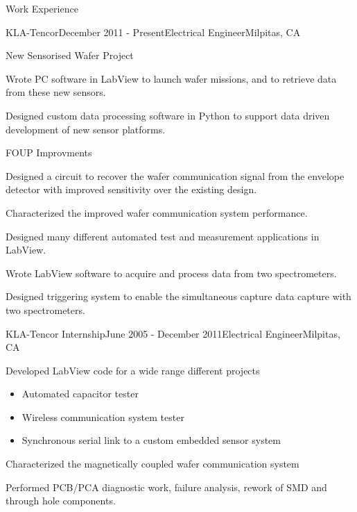 \documentclass{resume} %
\begin{document}
\begin{rSection}{Work Experience}
\begin{rSubsection}{KLA-Tencor}{December 2011 - Present}{Electrical Engineer}{Milpitas, CA}
\begin{rWorkProject}{New Sensorised Wafer Project}
\item Wrote PC software in LabView to launch wafer missions, and to retrieve data from these new sensors.
\item Designed custom data processing software in Python to support data driven development of new sensor platforms.
\end{rWorkProject}

\begin{rWorkProject}{FOUP Improvments}
\item Designed a circuit to recover the wafer communication signal from the envelope detector with improved sensitivity over the existing design.
\item Characterized the improved wafer communication system performance.
\end{rWorkProject}

\smallskip
\item Designed many different automated test and measurement applications in LabView.
\item Wrote LabView software to acquire and process data from two spectrometers.
\item Designed triggering system to enable the simultaneous capture data capture with two spectrometers.
\end{rSubsection}


\begin{rSubsection}{KLA-Tencor Internship}{June 2005 - December 2011}{Electrical Engineer}{Milpitas, CA}
\item Developed LabView code for a wide range different projects
\begin{itemize}
\itemsep -0.5em \vspace{-0.5em}
\renewcommand{\labelitemi}{-}
\item Automated capacitor tester
\item Wireless communication system tester
\item Synchronous serial link to a custom embedded sensor system
\end{itemize}
\item Characterized the magnetically coupled wafer communication system
\item Performed PCB/PCA diagnostic work, failure analysis, rework of SMD and through hole components.
\end{rSubsection}

\end{rSection}
\end{document}
